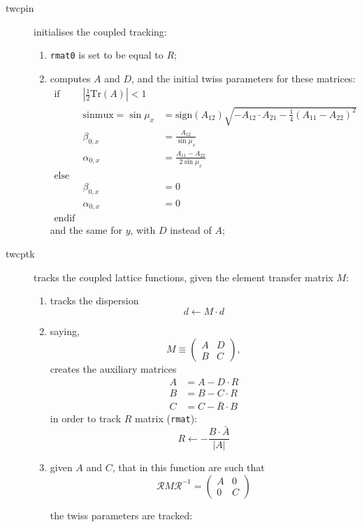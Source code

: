 \documentclass{cern-art} %
\renewcommand{\L}[1]{\lstinline[firstnumber=last]{#1}}
\begin{document}
\begin{description}
\item[twcpin] initialises the coupled tracking:
\\\begin{enumerate}
\item \L{rmat0} is set to be equal to $R$;
\item computes $A$ and $D$, and the initial twiss parameters for these matrices:
\[
\begin{array}{ccl}
\text{if} & \left|\frac{1}{2}\mathrm{Tr}\left(A\right)\right|<1\\
 & \mathrm{sinmux}=\sin\mu_{x} & =\mathrm{sign}\left(A_{12}\right)\sqrt{-A_{12}\cdot A_{21}-\frac{1}{4}\left(A_{11}-A_{22}\right)^{2}}\\
 & \beta_{0,x} & =\frac{A_{12}}{\sin\mu_{x}}\\
 & \alpha_{0,x} & =\frac{A_{11}-A_{22}}{2\sin\mu_{x}}\\
\text{else}\\
 & \beta_{0,x} & =0\\
 & \alpha_{0,x} & =0\\
\text{endif}
\end{array}
\]
and the same for $y$, with $D$ instead of $A$;
\end{enumerate}
\item[twcptk] tracks the coupled lattice functions, given the element transfer matrix $M$:
\begin{enumerate}
\item tracks the dispersion $$d \leftarrow M\cdot d$$
\item saying, 
$$M\equiv\left(\begin{array}{cc}
A & D\\
B & C
\end{array}\right),$$
creates the auxiliary matrices
\[
\begin{aligned}A & =A-D\cdot R\\
B & =B-C\cdot R\\
C & =C-\bar{R}\cdot B
\end{aligned}
\]
in order to track $R$ matrix (\L{rmat}):
\[
R\leftarrow-\frac{B\cdot\bar{A}}{\left|A\right|}
\]
\item given $A$ and $C$, that in this function are such that
\[\mathcal{R}M\mathcal{R}^{-1}=\left(\begin{array}{cc}
A & 0\\
0 & C
\end{array} \right) \]

the twiss parameters are tracked:
\end{enumerate}
\end{description}
\end{document}
